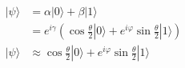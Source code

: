 \documentclass[preview]{standalone}
\begin{document}
\begin{align*}
|\psi\rangle &= \alpha |0\rangle + \beta |1\rangle \\ &=e^{i\gamma} \left(\cos{\frac{\theta}{2}} |0\rangle + e^{i\varphi}\sin{\frac{\theta}{2}}|1\rangle\right) \\ |\psi\rangle & \approx \cos{\frac{\theta}{2} |0\rangle + e^{i\varphi}\sin{\frac{\theta}{2}} |1\rangle}
\end{align*}
\end{document}
